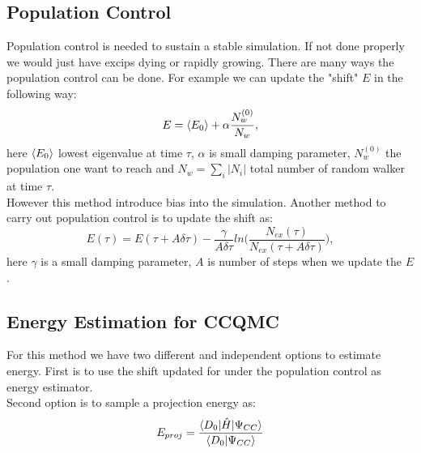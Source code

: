 \documentclass[twoside,english]{uiofysmaster}
\theoremstyle{definition}
\begin{document}
\subsection{Population Control}
Population control is needed to sustain a stable simulation. If not done properly we would just have excips dying or rapidly growing. There are many ways the population control can be done. For example we can update the "shift" $E$ in the following way:
\begin{equation}
E=\braket{E_0} + \alpha\frac{N_w^{(0)}}{N_w},
\end{equation}
here $\braket{E_0}$ lowest eigenvalue at time $\tau$, $\alpha$ is small damping parameter, $N_w^{(0)}$ the population one want to reach and $N_w=\sum_{i}|N_i|$ total number of random walker at time $\tau$.\\
However this method introduce bias into the simulation. Another method to carry out population control is to update the shift as:
\begin{equation}
E(\tau)=E(\tau+A\delta\tau) - \frac{\gamma}{A\delta\tau}ln\bigg( \frac{N_{ex}(\tau)}{N_{ex}(\tau+A\delta\tau)}  \bigg),
\end{equation}
here $\gamma$ is a small damping parameter, $A$ is number of steps when we update the $E$.
\subsection{Energy Estimation for CCQMC}
For this method we have two different and independent options to estimate energy. First is to use the shift updated for under the population control as energy estimator.\\
Second option is to sample a projection energy as:
\begin{equation}
E_{proj}=\frac{\braket{D_0|\hat{H}|\Psi_{CC}}}{\braket{D_0|\Psi_{CC}}}
\end{equation}
\end{document}
